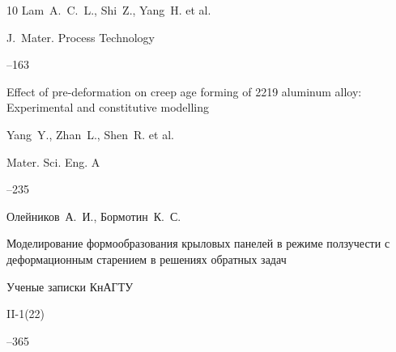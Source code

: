 \begin{thebibliography}{10}
\by Lam~A.~C.~L., Shi~Z., Yang~H. et al.

\jour J.~Mater. Process Technology


--163   









\paper Effect of pre-deformation on creep age forming of 2219 aluminum alloy: Experimental and constitutive modelling

\by Yang~Y., Zhan~L., Shen~R. et al.

\jour Mater. Sci. Eng. A


--235 











\by Олейников~А.~И., Бормотин~К.~С.

\paper Моделирование формообразования крыловых панелей в режиме ползучести с деформационным старением в решениях обратных задач

\jour Ученые записки КнАГТУ


\issue II-1(22)

--365









\end{thebibliography}
